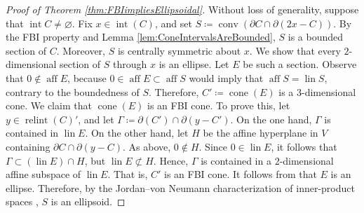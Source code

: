 \documentclass[10pt]{amsart}
\theoremstyle{definition}
\theoremstyle{remark}
\begin{document}
\begin{proof}[Proof of Theorem \ref{thm:FBIimpliesEllipsoidal}]
   \label{proof:FBIimpliesEllipsoidal}   Without loss of generality, suppose that ${\operatorname{int}}{C} \ne
   {\varnothing}$.  Fix $x \in {\operatorname{int}}(C)$, and set $S {\mathrel{\coloneqq}}
   \operatorname{conv}({\partial} C \cap {\partial}(2x - C))$.  By the FBI property and
   Lemma \ref{lem:ConeIntervalsAreBounded}, $S$ is a bounded
   section of $C$.  Moreover, $S$ is centrally symmetric about
   $x$.  We show that every $2$-dimensional section of $S$ through
   $x$ is an ellipse.  Let $E$ be such a section.  Observe that $0
   \notin \operatorname{aff} E$, because $0 \in \operatorname{aff} E \subset \operatorname{aff} S$ would
   imply that $\operatorname{aff} S = \operatorname{lin} S$, contrary to the boundedness of
   $S$.  Therefore, $C' {\mathrel{\coloneqq}} \operatorname{cone}(E)$ is a $3$-dimensional
   cone.  We claim that $\operatorname{cone}(E)$ is an FBI cone.  To prove this,
   let $y \in {\operatorname{relint}(C)}'$, and let $\Gamma {\mathrel{\coloneqq}} {\partial}(C')
   \cap {\partial}(y - C')$.  On the one hand, $\Gamma$ is contained in
   $\operatorname{lin} E$.  On the other hand, let $H$ be the affine hyperplane
   in $V$ containing ${\partial} C \cap {\partial}(y - C)$.  As above, $0
   \notin H$.  Since $0 \in \operatorname{lin} E$, it follows that $\Gamma
   \subset (\operatorname{lin} E) \cap H$, but $\operatorname{lin} E \not\subset H$.  Hence,
   $\Gamma$ is contained in a $2$-dimensional affine subspace of
   $\operatorname{lin} E$.  That is, $C'$ is an FBI cone.  It follows from
   \cite[Theorem 1.2]{JerMcA2013} that $E$ is an ellipse.
   Therefore, by the Jordan--von Neumann characterization of
   inner-product spaces \cite{JorvNeu1935}, $S$ is an ellipsoid.
\end{proof}
\end{document}
